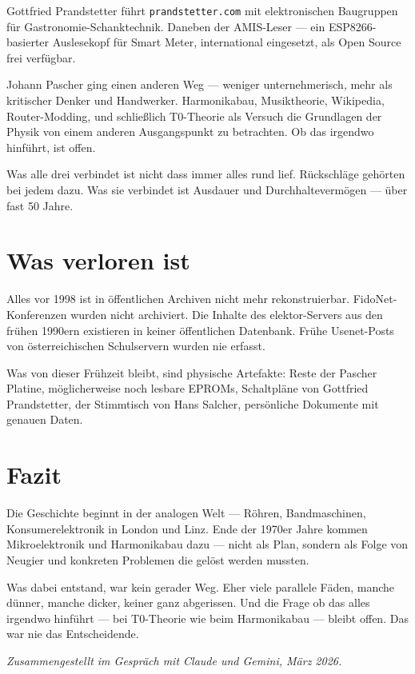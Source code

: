 \documentclass[a4paper,12pt]{article}
\begin{document}
Gottfried Prandstetter führt \texttt{prandstetter.com} mit elektronischen Baugruppen für Gastronomie-Schanktechnik. Daneben der AMIS-Leser --- ein ESP8266-basierter Auslesekopf für Smart Meter, international eingesetzt, als Open Source frei verfügbar.

Johann Pascher ging einen anderen Weg --- weniger unternehmerisch, mehr als kritischer Denker und Handwerker. Harmonikabau, Musiktheorie, Wikipedia, Router-Modding, und schließlich T0-Theorie als Versuch die Grundlagen der Physik von einem anderen Ausgangspunkt zu betrachten. Ob das irgendwo hinführt, ist offen.

Was alle drei verbindet ist nicht dass immer alles rund lief. Rückschläge gehörten bei jedem dazu. Was sie verbindet ist Ausdauer und Durchhaltevermögen --- über fast 50 Jahre.

\section{Was verloren ist}

Alles vor 1998 ist in öffentlichen Archiven nicht mehr rekonstruierbar. FidoNet-Konferenzen wurden nicht archiviert. Die Inhalte des elektor-Servers aus den frühen 1990ern existieren in keiner öffentlichen Datenbank. Frühe Usenet-Posts von österreichischen Schulservern wurden nie erfasst.

Was von dieser Frühzeit bleibt, sind physische Artefakte: Reste der Pascher Platine, möglicherweise noch lesbare EPROMs, Schaltpläne von Gottfried Prandstetter, der Stimmtisch von Hans Salcher, persönliche Dokumente mit genauen Daten.

\section{Fazit}

Die Geschichte beginnt in der analogen Welt --- Röhren, Bandmaschinen, Konsumerelektronik in London und Linz. Ende der 1970er Jahre kommen Mikroelektronik und Harmonikabau dazu --- nicht als Plan, sondern als Folge von Neugier und konkreten Problemen die gelöst werden mussten.

Was dabei entstand, war kein gerader Weg. Eher viele parallele Fäden, manche dünner, manche dicker, keiner ganz abgerissen. Und die Frage ob das alles irgendwo hinführt --- bei T0-Theorie wie beim Harmonikabau --- bleibt offen. Das war nie das Entscheidende.

\bigskip
\textit{Zusammengestellt im Gespräch mit Claude und Gemini, März 2026.}
\end{document}
